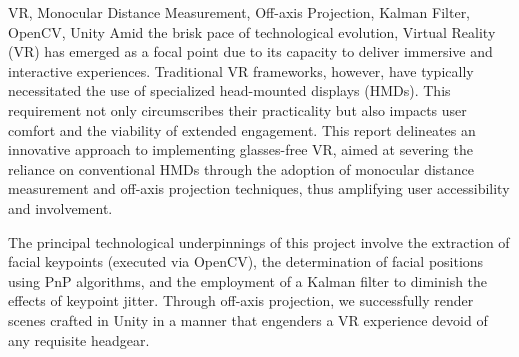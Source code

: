 

\begin{英文摘要}{VR, Monocular Distance Measurement, Off-axis Projection, Kalman Filter, OpenCV, Unity}
Amid the brisk pace of technological evolution, Virtual Reality (VR) has emerged as a focal point due to its capacity to deliver immersive and interactive experiences. Traditional VR frameworks, however, have typically necessitated the use of specialized head-mounted displays (HMDs). This requirement not only circumscribes their practicality but also impacts user comfort and the viability of extended engagement. This report delineates an innovative approach to implementing glasses-free VR, aimed at severing the reliance on conventional HMDs through the adoption of monocular distance measurement and off-axis projection techniques, thus amplifying user accessibility and involvement.

The principal technological underpinnings of this project involve the extraction of facial keypoints (executed via OpenCV), the determination of facial positions using PnP algorithms, and the employment of a Kalman filter to diminish the effects of keypoint jitter. Through off-axis projection, we successfully render scenes crafted in Unity in a manner that engenders a VR experience devoid of any requisite headgear.

\end{英文摘要}
